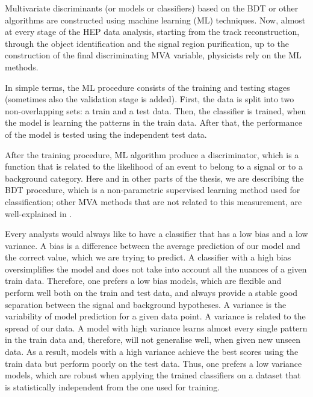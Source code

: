 Multivariate discriminants (or models or classifiers) based on the BDT or other algorithms are constructed using machine learning (ML) techniques. Now, almost at every stage of the HEP data analysis, starting from the track reconstruction, through the object identification and the signal region purification, up to the construction of the final discriminating MVA variable, physicists rely on the ML methods.
           
In simple terms, the ML procedure consists of the training and testing stages (sometimes also the validation stage is added). First, the data is split into two non-overlapping sets: a train and a test data. Then, the classifier is trained, when the model is learning the patterns in the train data. After that, the performance of the model is tested using the independent test data. 

After the training procedure, ML algorithm produce a discriminator, which is a function that is related to the likelihood of an event to belong to a signal or to a background category. Here and in other parts of the thesis, we are describing the BDT procedure, which is a non-parametric supervised learning method used for classification; other MVA methods that are not related to this measurement, are well-explained in \cite{book:411471}. 

Every analysts would always like to have a classifier that has a low bias and a low variance. A bias is a difference between the average prediction of our model and the correct value, which we are trying to predict. A classifier with a high bias oversimplifies the model and does not take into account all the nuances of a given train data. Therefore, one prefers a low bias models, which are flexible and perform well both on the train and test data, and always provide a stable good separation between the signal and background hypotheses. A variance is the variability of model prediction for a given data point. A variance is related to the spread of our data. A model with high variance learns almost every single pattern in the train data and, therefore, will not generalise well, when given new unseen data. As a result, models with a high variance achieve the best scores using the train data but perform poorly on the test data. Thus, one prefers a low variance models, which are robust when applying the trained classifiers on a dataset that is statistically independent from the one used for training.

